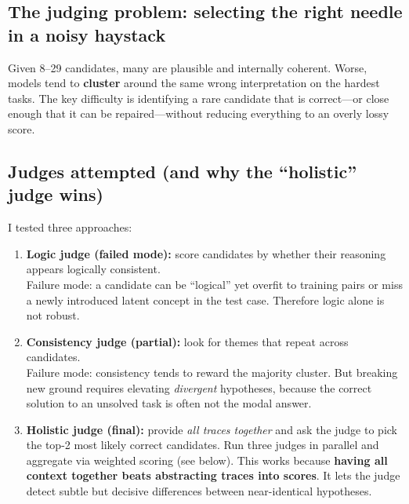 \documentclass[11pt]{article}
\begin{document}
\hypertarget{the-judging-problem-selecting-the-right-needle-in-a-noisy-haystack}{%
\subsection{The judging problem: selecting the right needle in a noisy
haystack}\label{the-judging-problem-selecting-the-right-needle-in-a-noisy-haystack}}

Given 8--29 candidates, many are plausible and internally coherent.
Worse, models tend to \textbf{cluster} around the same wrong
interpretation on the hardest tasks. The key difficulty is identifying a
rare candidate that is correct---or close enough that it can be
repaired---without reducing everything to an overly lossy score.

\hypertarget{judges-attempted-and-why-the-holistic-judge-wins}{%
\subsection{Judges attempted (and why the ``holistic'' judge
wins)}\label{judges-attempted-and-why-the-holistic-judge-wins}}

I tested three approaches:

\begin{enumerate}
\def\labelenumi{\arabic{enumi}.}
\item
  \textbf{Logic judge (failed mode):} score candidates by whether their
  reasoning appears logically consistent.\\
  Failure mode: a candidate can be ``logical'' yet overfit to training
  pairs or miss a newly introduced latent concept in the test case.
  Therefore logic alone is not robust.
\item
  \textbf{Consistency judge (partial):} look for themes that repeat
  across candidates.\\
  Failure mode: consistency tends to reward the majority cluster. But
  breaking new ground requires elevating \emph{divergent} hypotheses,
  because the correct solution to an unsolved task is often not the
  modal answer.
\item
  \textbf{Holistic judge (final):} provide \emph{all traces together}
  and ask the judge to pick the top-2 most likely correct candidates.
  Run three judges in parallel and aggregate via weighted scoring (see
  below). This works because \textbf{having all context together beats
  abstracting traces into scores}. It lets the judge detect subtle but
  decisive differences between near-identical hypotheses.
\end{enumerate}
\end{document}
